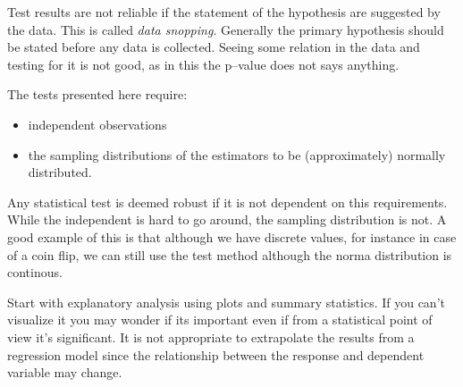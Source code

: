 Test results are not reliable if the statement of the hypothesis are suggested
by the data. This is called \emph{data snopping}. Generally the primary
hypothesis should be stated before any data is collected. Seeing some relation
in the data and testing for it is not good, as in this the p--value does not
says anything.

The tests presented here require:

\begin{itemize}
  \item independent observations
  \item the sampling distributions of the estimators to be (approximately)
  normally distributed.
\end{itemize}

Any statistical test is deemed robust if it is not dependent on this
requirements. While the independent is hard to go around, the sampling
distribution is not. A good example of this is that although we have discrete
values, for instance in case of a coin flip, we can still use the test method
although the norma distribution is continous.

Start with explanatory analysis using plots and summary statistics. If you can't
visualize it you may wonder if its important even if from a statistical point of
view it's significant. It is not appropriate to extrapolate the results from a
regression model since the relationship between the response and dependent
variable may change.
